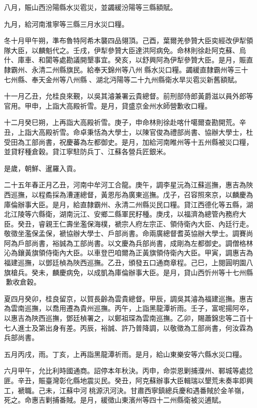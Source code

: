 \begin{pinyinscope}
八月，賑山西汾陽縣水災雹災，並蠲緩汾陽等三縣額賦。

九月，給河南淮寧等三縣三月水災口糧。

冬十月甲午朔，準布魯特阿希木襲四品翎頂。己酉，葉爾羌參贊大臣奕經改伊犁領隊大臣，以麟魁代之。壬戌，伊犁參贊大臣達洪阿病免。命林則徐赴阿克蘇、烏什、庫車、和闐等處勘議開墾事宜。癸亥，以舒興阿為伊犁參贊大臣。是月，賑直隸霸州、永清二州縣旗民。給奉天錦州等八州縣水災口糧。蠲緩直隸霸州等三十七州縣、奉天金州等八州縣、湖北沔陽等二十九州縣衛水旱災雹災新舊額賦。

十一月乙丑，允桂良來覲，以吳其濬兼署云貴總督。前刑部侍郎黃爵滋以員外郎等官用。甲申，上詣大高殿祈雪。是月，貸盛京金州水師營歉收口糧。

十二月癸巳朔，上再詣大高殿祈雪。庚子，申命林則徐赴喀什噶爾查勘開荒。辛丑，上詣大高殿祈雪。命卓秉恬為大學士，以陳官俊為禮部尚書、協辦大學士，杜受田為工部尚書，祝慶蕃為左都御史。是月，加給河南睢州等十五州縣被災口糧，並貸籽種倉穀。貸江寧駐防兵丁、江蘇各營兵匠銀米。

是歲，朝鮮、暹羅入貢。

二十五年春正月乙丑，河南中牟河工合龍。庚午，調李星沅為江蘇巡撫，惠吉為陜西巡撫，以程矞採為漕運總督，黃恩彤為廣東巡撫。戊子，召容照來京，以麟慶為庫倫辦事大臣。是月，給直隸霸州、永清二州縣災民口糧。貸江西德化等五縣，湖北江陵等六縣衛，湖南沅江、安鄉二縣軍民籽種。庚戌，以福濟為總管內務府大臣。癸丑，睿親王仁壽坐濫保海樸，褫宗人府左宗正、領侍衛內大臣、內廷行走。敬徵坐濫保孟保，褫協辦大學士、戶部尚書。命兩廣總督耆英協辦大學士。調賽尚阿為戶部尚書，裕誠為工部尚書。以文慶為兵部尚書，成剛為左都御史。調僧格林沁為鑲黃旗領侍衛內大臣。以車登巴咱爾為正黃旗領侍衛內大臣。甲寅，調惠吉為福建巡撫，以鄧廷楨為陜西巡撫。乙丑，頒發五口通商章程。己巳，上閱圓明園八旗槍兵。癸未，麟慶病免，以成凱為庫倫辦事大臣。是月，貸山西忻州等十七州縣歉收倉穀。

夏四月癸卯，桂良留京，以賀長齡為雲貴總督。甲辰，調吳其濬為福建巡撫。惠吉為雲南巡撫，以喬用遷為貴州巡撫。丙午，上詣黑龍潭祈雨。壬子，富呢揚阿卒，以惠吉為陜西巡撫，鄧廷楨署之，以鄭祖琛為雲南巡撫。乙卯，賜蕭錦忠等二百十七人進士及第出身有差。丙辰，裕誠、許乃普降調，以敬徵為工部尚書，何汝霖為兵部尚書。

五月丙戌，雨。丁亥，上再詣黑龍潭祈雨。是月，給山東樂安等六縣水災口糧。

六月甲午，允比利時國通商。詔停本年秋決。丙申，命崇恩剿捕濮州、鄆城等處捻匪。辛丑，賑臺灣彰化縣地震災民。癸丑，阿克蘇辦事大臣輯瑞以墾荒未奏率即興工，褫職。己未，江蘇中河桃源汛河決。甘肅西寧鎮總兵慶和遇番賊於金羊嶺，死之。命惠吉剿捕番賊。是月，緩徵山東濱州等四十二州縣衛被災逋賦。


\end{pinyinscope}
